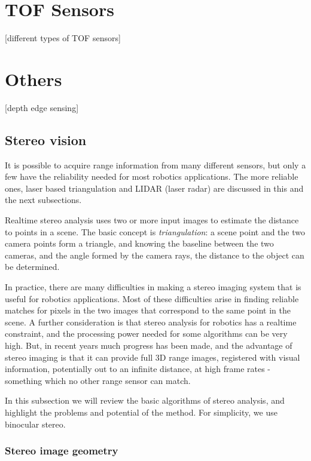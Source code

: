 \documentclass[twocolumn,oneside]{book}
\begin{document}
\section{TOF Sensors}

[different types of TOF sensors]

\section{Others}

[depth edge sensing]


\subsection{Stereo vision}

It is possible to acquire range information from many different
sensors, but only a few have the reliability needed for most robotics
applications.  The more reliable ones,  laser based triangulation and LIDAR (laser radar) are
discussed in this and the next subsections.

Realtime stereo analysis uses two or more input images to estimate the
distance to points in a scene.  The basic concept is {\em
  triangulation}: a scene point and the two camera points form a
triangle, and knowing the baseline between the two cameras, and the
angle formed by the camera rays, the distance to the object can be
determined.

In practice, there are many difficulties in making a stereo imaging
system that is useful for robotics applications.  Most of these
difficulties arise in finding reliable matches for pixels in the two
images that correspond to the same point in the scene.  A further
consideration is that stereo analysis for robotics has a realtime
constraint, and the processing power needed for some algorithms can be
very high.  But, in recent years much progress has been made, and the
advantage of stereo imaging is that it can provide full 3D range
images, registered with visual information, potentially out to an
infinite distance, at high frame rates - something which no other
range sensor can match.

In this subsection we will review the basic algorithms of stereo
analysis, and highlight the problems and potential of the method.
For simplicity, we use binocular stereo.

\subsubsection{Stereo image geometry}
\end{document}
